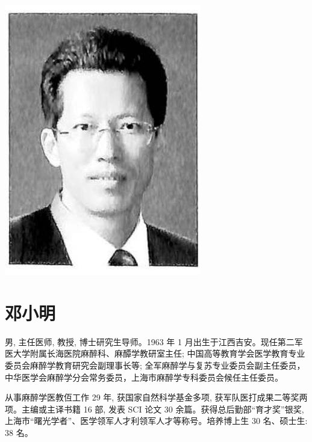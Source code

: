 \documentclass[10pt]{article}
\begin{document}
\begin{center}
\includegraphics[max width=\textwidth]{2024_07_09_002a177993bd97d1d6d7g-014(3)}
\end{center}

\section*{邓小明}
男, 主任医师, 教授, 博士研究生导师。1963 年 1 月出生于江西吉安。现任第二军医大学附属长海医院麻醉科、麻醰学教研室主任; 中国高等教育学会医学教育专业委员会麻醉学教育研究会副理事长等; 全军麻醉学与复苏专业委员会副主任委员，中华医学会麻醉学分会常务委员，上海市麻醉学专科委员会候任主任委员。

从事麻醉学医教仾工作 29 年, 获国家自然科学基金多项, 获军队医打成果二等奖两项。主编或主译书籍 16 部, 发表 SCI 论文 30 余篇。获得总后勤部“育才奖”银奖, 上海市“曙光学者”、医学领军人才利领军人才等称号。培养博上生 30 名、硕士生: 38 名。
\end{document}
